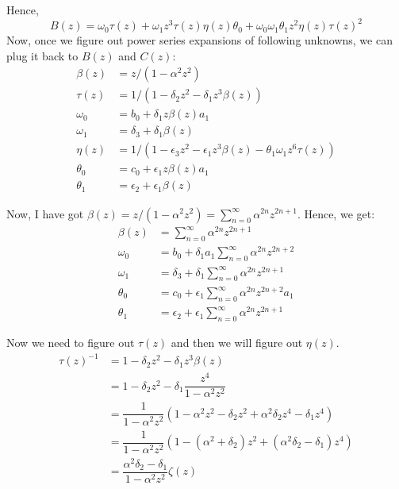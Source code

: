 \documentclass[11pt,a4paper]{article}
\begin{document}
Hence, 
\begin{equation}
\boxed{B(z)  = \omega_0 \tau(z) +    \omega_1 z^3  \tau(z) \eta(z) \theta_0 + \omega_0 \omega_1  \theta_1    z^2 \eta(z)  \tau(z) ^2   }
\end{equation}
Now, once we figure out  power series expansions of following unknowns, we can plug it back to $B(z)$ and $C(z)$:
\begin{align*}
\beta(z) &= z/(1 -\alpha^2  z^2 ) \\
 \tau(z) &= 1/ (1 - \delta_2 z^2 -\delta_1  z^3   \beta(z) )\\
 \omega_0 &= b_0 +  \delta_1  z   \beta(z)  a_1  \\
 \omega_1 &= \delta_3 +  \delta_1     \beta(z)\\
 \eta(z)&=1/(1 - \epsilon_3 z^2 - \epsilon_1  z^3   \beta(z) -\theta_1   \omega_1  z^6 \tau(z)   )\\
 \theta_0&= c_0 +  \epsilon_1  z \beta(z) a_1\\
 \theta_1&= \epsilon_2 + \epsilon_1   \beta(z)
\end{align*}

Now, I have got $\beta(z) = z/(1 -\alpha^2  z^2 ) = \sum_{n=0}^{\infty} \alpha^{2n}z^{2n+1}$. Hence, we get:
\begin{align*}
\beta(z) &= \sum_{n=0}^{\infty} \alpha^{2n}z^{2n+1} \\
 \omega_0 &= b_0 +  \delta_1       a_1  \sum_{n=0}^{\infty} \alpha^{2n}z^{2n+2} \\
 \omega_1 &= \delta_3 +  \delta_1  \sum_{n=0}^{\infty} \alpha^{2n}z^{2n+1}\\
 \theta_0&= c_0 +  \epsilon_1   \sum_{n=0}^{\infty} \alpha^{2n}z^{2n+2} a_1\\
 \theta_1&= \epsilon_2 + \epsilon_1   \sum_{n=0}^{\infty} \alpha^{2n}z^{2n+1}
\end{align*}

Now we need to figure out $\tau(z)$ and then we will figure out $\eta(z)$.
\begin{align*}
\tau(z)^{-1} &=  1 - \delta_2 z^2 -\delta_1  z^3   \beta(z)  \\
&=  1 - \delta_2 z^2 -\delta_1  \dfrac{z^4}{ 1 -\alpha^2  z^2 }    \\
&=  \dfrac{1} {1 -\alpha^2  z^2 }   (1 -\alpha^2  z^2- \delta_2 z^2 + \alpha^2 \delta_2 z^4 -\delta_1 z^4) \\
&=  \dfrac{1} {1 -\alpha^2  z^2 }   (1 -(\alpha^2 + \delta_2) z^2 + (\alpha^2 \delta_2 -\delta_1) z^4) \\
&= \dfrac{\alpha^2 \delta_2 -\delta_1} {1 -\alpha^2  z^2 } \zeta  (z) 
\end{align*}
\end{document}
